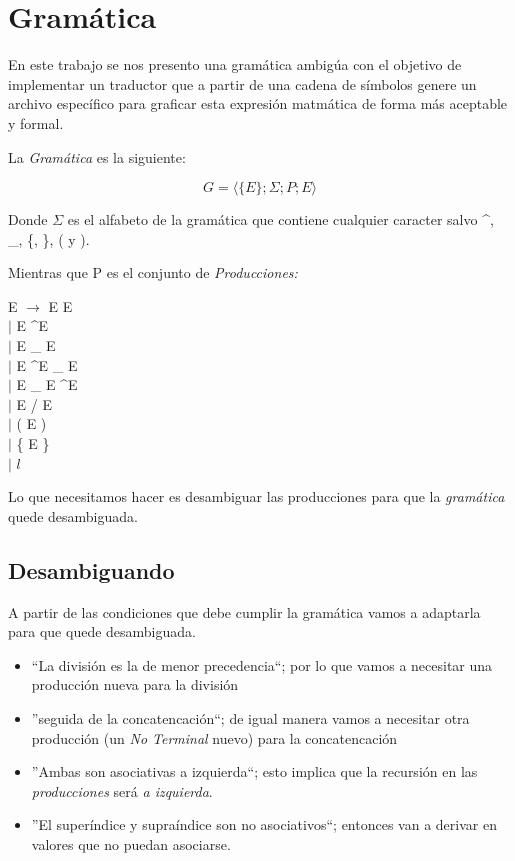 \section{Gramática}

En este trabajo se nos presento una gramática ambigúa con el objetivo de implementar un traductor que a partir de una cadena de símbolos genere un archivo específico para graficar esta expresión matmática de forma más aceptable y formal.

La \textit{Gramática} es la siguiente:

 \begin{equation}
    G = \langle \{ E\};\Sigma;P;E \rangle
 \end{equation}

Donde $\Sigma$ es el alfabeto de la gramática que contiene cualquier caracter salvo \textasciicircum, \_, \{, \}, ( y ).

Mientras que P es el conjunto de \textit{Producciones:}

\begin{center}
 E $\rightarrow$ E E 
\\  $|$ E \textasciicircum E
\\  $|$ E \_ E
\\  $|$ E \textasciicircum E \_ E
\\  $|$ E \_ E \textasciicircum E
\\  $|$ E / E
\\  $|$ ( E )
\\  $|$ \{ E \} 
\\  $|$ $l$
\end{center}

Lo que necesitamos hacer es desambiguar las producciones para que la \textit{gramática} quede desambiguada.

\subsection{Desambiguando}

A partir de las condiciones que debe cumplir la gramática vamos a adaptarla para que quede desambiguada.

\begin{itemize}
 \item ``La división es la de menor precedencia``; por lo que vamos a necesitar una producción nueva para la división
 \item ''seguida de la concatencación``; de igual manera vamos a necesitar otra producción (un \textit{No Terminal} nuevo) para la concatencación
  \item ''Ambas son asociativas a izquierda``; esto implica que la recursión en las \textit{producciones} será \textit{a izquierda}.
  \item ''El superíndice y supraíndice son no asociativos``; entonces van a derivar en valores que no puedan asociarse.
\end{itemize}

